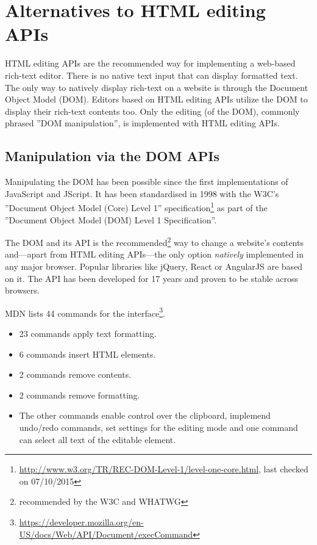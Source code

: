 \section{Alternatives to HTML editing APIs}

HTML editing APIs are the recommended way for implementing a web-based rich-text editor. There is no native text input that can display formatted text. The only way to natively display rich-text on a website is through the Document Object Model (DOM). Editors based on HTML editing APIs utilize the DOM to display their rich-text contents too. Only the editing (of the DOM), commonly phrased ''DOM manipulation'', is implemented with HTML editing APIs.

\subsection{Manipulation via the DOM APIs}
\label{subsec:manip_via_dom}

Manipulating the DOM has been possible since the first implementations of JavaScript and JScript. It has been standardised in 1998 with the W3C's ''Document Object Model (Core) Level 1'' specification\footnote{\url{http://www.w3.org/TR/REC-DOM-Level-1/level-one-core.html}, last checked on 07/10/2015} as part of the ''Document Object Model (DOM) Level 1 Specification''.

The DOM and its API is the recommended\footnote{recommended by the W3C and WHATWG} way to change a website's contents and---apart from HTML editing APIs---the only option \textit{natively} implemented in any major browser. Popular libraries like jQuery, React or AngularJS are based on it. The API has been developed for 17 years and proven to be stable across browsers. 

MDN lists 44 commands for the  interface\footnote{\url{https://developer.mozilla.org/en-US/docs/Web/API/Document/execCommand}}. 

\begin{itemize}
\item 23 commands apply text formatting.
\item 6 commands insert HTML elements.
\item 2 commands remove contents.
\item 2 commands remove formatting.
\item The other commands enable control over the clipboard, implemend undo/redo commands, set settings for the editing mode and one command can select all text of the editable element.
\end{itemize}


